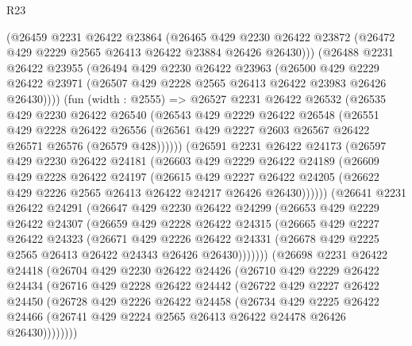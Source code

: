 \begin{lexlean}{R23}
\begin{coremodule}
    (@26459
      @2231
      @26422
      @23864
      (@26465
        @429
        @2230
        @26422
        @23872
        (@26472 @429 @2229 @2565 @26413 @26422 @23884 @26426 @26430)))
    (@26488
      @2231
      @26422
      @23955
      (@26494
        @429
        @2230
        @26422
        @23963
        (@26500
          @429
          @2229
          @26422
          @23971
          (@26507 @429 @2228 @2565 @26413 @26422 @23983 @26426 @26430))))
    (fun (width : @2555) =>
    @26527
      @2231
      @26422
      @26532
      (@26535
        @429
        @2230
        @26422
        @26540
        (@26543
          @429
          @2229
          @26422
          @26548
          (@26551
            @429
            @2228
            @26422
            @26556
            (@26561 @429 @2227 @2603 @26567 @26422 @26571 @26576 (@26579 @428))))))
    (@26591
      @2231
      @26422
      @24173
      (@26597
        @429
        @2230
        @26422
        @24181
        (@26603
          @429
          @2229
          @26422
          @24189
          (@26609
            @429
            @2228
            @26422
            @24197
            (@26615
              @429
              @2227
              @26422
              @24205
              (@26622 @429 @2226 @2565 @26413 @26422 @24217 @26426 @26430))))))
    (@26641
      @2231
      @26422
      @24291
      (@26647
        @429
        @2230
        @26422
        @24299
        (@26653
          @429
          @2229
          @26422
          @24307
          (@26659
            @429
            @2228
            @26422
            @24315
            (@26665
              @429
              @2227
              @26422
              @24323
              (@26671
                @429
                @2226
                @26422
                @24331
                (@26678 @429 @2225 @2565 @26413 @26422 @24343 @26426 @26430)))))))
    (@26698
      @2231
      @26422
      @24418
      (@26704
        @429
        @2230
        @26422
        @24426
        (@26710
          @429
          @2229
          @26422
          @24434
          (@26716
            @429
            @2228
            @26422
            @24442
            (@26722
              @429
              @2227
              @26422
              @24450
              (@26728
                @429
                @2226
                @26422
                @24458
                (@26734
                  @429
                  @2225
                  @26422
                  @24466
                  (@26741 @429 @2224 @2565 @26413 @26422 @24478 @26426 @26430))))))))

\end{coremodule}
\end{lexlean}
